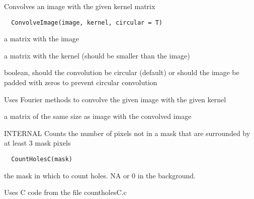 \documentclass[a4paper]{book}
\begin{document}
%
\begin{Description}\relax
Convolves an image with the given kernel matrix
\end{Description}
%
\begin{Usage}
\begin{verbatim}
  ConvolveImage(image, kernel, circular = T)
\end{verbatim}
\end{Usage}
%
\begin{Arguments}
\begin{ldescription}
\item[\code{image}] a matrix with the image

\item[\code{kernel}] a matrix with the kernel (should be smaller
than the image)

\item[\code{circular}] boolean, should the convolution be
circular (default) or should the image be padded with
zeros to prevent circular convolution
\end{ldescription}
\end{Arguments}
%
\begin{Details}\relax
Uses Fourier methods to convolve the given image with the
given kernel
\end{Details}
%
\begin{Value}
a matrix of the same size as image with the convolved
image
\end{Value}
%
\begin{Description}\relax
INTERNAL Counts the number of pixels not in a mask that
are surrounded by at least 3 mask pixels
\end{Description}
%
\begin{Usage}
\begin{verbatim}
  CountHolesC(mask)
\end{verbatim}
\end{Usage}
%
\begin{Arguments}
\begin{ldescription}
\item[\code{mask}] the mask in which to count holes.  NA or 0 in
the background.
\end{ldescription}
\end{Arguments}
%
\begin{Details}\relax
Uses C code from the file countholesC.c
\end{Details}
\end{document}
